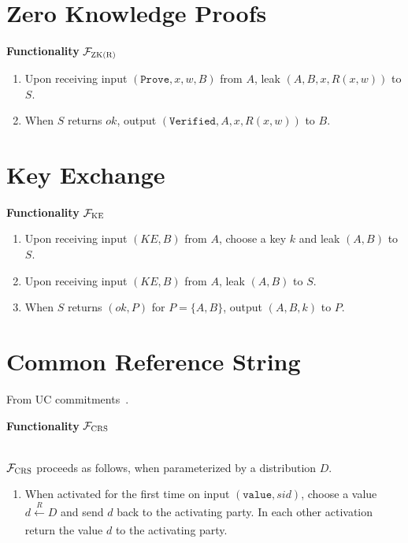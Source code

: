 \documentclass[a4paper]{article}
\newcommand{\F}{\mathcal{F}}
\begin{document}
\section{Zero Knowledge Proofs}

\begin{framed}
    \centerline{\textbf{Functionality} $\F_{\textsc{ZK(R)}}$}
    \begin{enumerate}
        \item Upon receiving input $(\texttt{Prove}, x, w, B)$ from $A$, leak $(A, B, x, R(x,w))$ to $S$.
        \item When $S$ returns $ok$, output $(\texttt{Verified}, A, x, R(x,w))$ to $B$.
    \end{enumerate}
\end{framed}



\section{Key Exchange}

\begin{framed}
    \centerline{\textbf{Functionality} $\F_{\textsc{KE}}$}
    \begin{enumerate}
        \item Upon receiving input $(KE, B)$ from $A$, choose a key $k$ and leak $(A,B)$ to $S$.
        \item Upon receiving input $(KE, B)$ from $A$, leak $(A,B)$ to $S$.
        \item When $S$ returns $(ok, P)$ for $P=\{A,B\}$, output $(A,B,k)$ to $P$.
    \end{enumerate}
\end{framed}




\section{Common Reference String}

From UC commitments~\cite{canetti2001universally}.

\begin{framed}
    \centerline{\textbf{Functionality} $\F_{\textsc{CRS}}$}
    \ \\
    \noindent $\F_{\textsc{CRS}}$ proceeds as follows, when parameterized by a distribution $D$.

    \begin{enumerate}
        \item When activated for the first time on input $(\texttt{value}, sid)$, choose a value $d \xleftarrow[]{R} D$ and send $d$ back to the activating party. In each other activation return the value $d$ to the activating party.
    \end{enumerate}
\end{framed}
\end{document}
